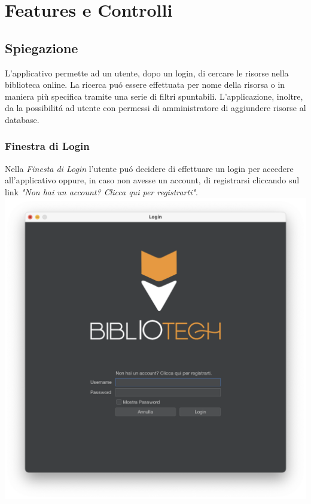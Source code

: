 \chapter{Features e Controlli}
 \section{Spiegazione}
 L'applicativo permette ad un utente, dopo un login, di cercare le risorse nella biblioteca online.
 La ricerca pu\'o essere effettuata per nome della risorsa o in maniera più specifica tramite una serie di
 filtri spuntabili.
 L'applicazione, inoltre, da la possibilit\'a ad utente con permessi di amministratore di aggiundere risorse 
 al database.


 \subsection{Finestra di Login}
 Nella \textit{Finesta di Login} l'utente pu\'o decidere di effettuare un login per accedere all'applicativo oppure,
 in caso non avesse un account, di registrarsi cliccando sul link \textit{"Non hai un account? Clicca
 qui per registrarti"}.
 \\
 \includegraphics[scale=0.25, center]{Immagini/Schermate/Login_Register/LoginPage.png}

